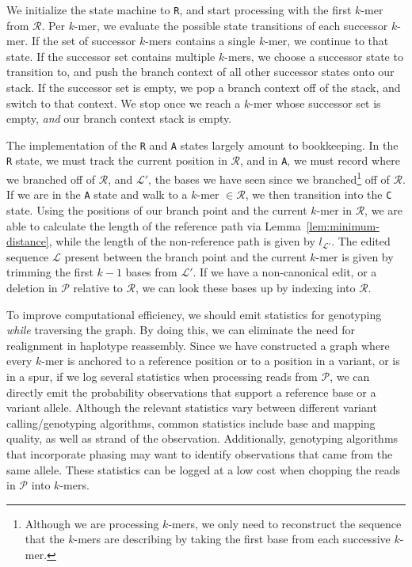 \documentclass[masters]{ucbthesis}
\begin{document}
We initialize the state machine to \texttt{R}, and start processing with the first $k$-mer from $\mathcal{R}$.
Per $k$-mer, we evaluate the possible state transitions of each successor $k$-mer. If the set of successor
$k$-mers contains a single $k$-mer, we continue to that state. If the successor set contains multiple
$k$-mers, we choose a successor state to transition to, and push the branch context of all other
successor states onto our stack. If the successor set is empty, we pop a branch context off of the stack,
and switch to that context. We stop once we reach a $k$-mer whose successor set is empty, \emph{and}
our branch context stack is empty.

The implementation of the \texttt{R} and \texttt{A} states largely amount to bookkeeping. In the \texttt{R}
state, we must track the current position in $\mathcal{R}$, and in \texttt{A}, we must record where we
branched off of $\mathcal{R}$, and $\mathcal{L}'$, the bases we have seen since we
branched\footnote{Although we are processing $k$-mers, we only need to reconstruct the sequence that
the $k$-mers are describing by taking the first base from each successive $k$-mer.} off of $\mathcal{R}$.
If we are in the \texttt{A} state and walk to a $k$-mer $\in \mathcal{R}$, we then transition into the
\texttt{C} state. Using the positions of our branch point and the current $k$-mer in $\mathcal{R}$, we are
able to calculate the length of the reference path via Lemma~\ref{lem:minimum-distance}, while the length
of the non-reference path is given by $l_{\mathcal{L}'}$. The edited sequence $\mathcal{L}$ present
between the branch point and the current $k$-mer is given by trimming the first $k - 1$ bases from
$\mathcal{L}'$. If we have a non-canonical edit, or a deletion in $\mathcal{P}$ relative to $\mathcal{R}$,
we can look these bases up by indexing into $\mathcal{R}$.

To improve computational efficiency, we should emit statistics for genotyping \emph{while} traversing the graph. By doing 
this, we can eliminate the need for realignment in haplotype reassembly. Since we have constructed a
graph where every $k$-mer is anchored to a reference position or to a position in a variant, or is in a spur,
if we log several statistics when processing reads from $\mathcal{P}$, we can directly emit the probability
observations that support a reference base or a variant allele. Although the relevant statistics vary
between different variant calling/genotyping algorithms, common statistics include base and mapping
quality, as well as strand of the observation. Additionally, genotyping algorithms that incorporate phasing
may want to identify observations that came from the same allele. These statistics can be logged at a low cost when
chopping the reads in $\mathcal{P}$ into $k$-mers.
\end{document}
